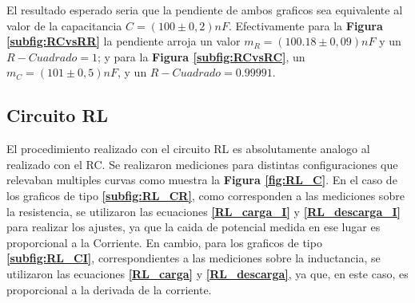 \documentclass[11pt,a4paper]{article}
\begin{document}
El resultado esperado seria que la pendiente de ambos graficos sea equivalente al valor de la capacitancia $C = (100 \pm 0,2)nF$. Efectivamente para la \textbf{Figura \ref{subfig:RCvsRR}} la pendiente arroja un valor $m_{R} = (100.18 \pm 0,09)nF$ y un $R-Cuadrado = 1$; y para la \textbf{Figura \ref{subfig:RCvsRC}}, un $m_{C} = (101 \pm 0,5)nF$, y un $R-Cuadrado = 0.99991$. 


\subsection{Circuito RL}

El procedimiento realizado con el circuito RL es absolutamente analogo al realizado con el RC. Se realizaron mediciones para distintas configuraciones que relevaban multiples curvas como muestra la \textbf{Figura \ref{fig:RL_C}}. En el caso de los graficos de tipo \textbf{\ref{subfig:RL_CR}}, como corresponden a las mediciones sobre la resistencia, se utilizaron las ecuaciones \textbf{\ref{RL_carga_I}} y \textbf{\ref{RL_descarga_I}} para realizar los ajustes, ya que la caida de potencial medida en ese lugar es proporcional a la Corriente. En cambio, para los graficos de tipo \textbf{\ref{subfig:RL_CI}}, correspondientes a las mediciones sobre la inductancia, se utilizaron las ecuaciones \textbf{\ref{RL_carga}} y \textbf{\ref{RL_descarga}}, ya que, en este caso, es proporcional a la derivada de la corriente.
\end{document}

